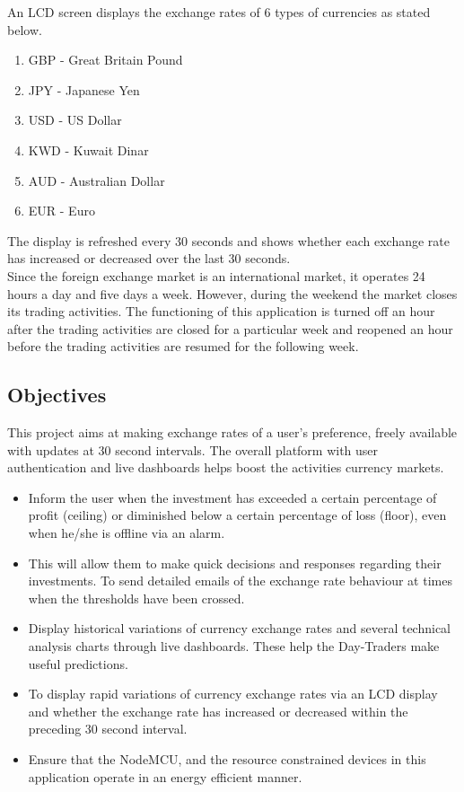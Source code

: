 An LCD screen displays the exchange rates of 6 types of currencies as stated below.

\begin{enumerate}[itemsep=-1.7mm]

\item GBP - Great Britain Pound
\item JPY - Japanese Yen
\item USD - US Dollar
\item KWD - Kuwait Dinar
\item AUD - Australian Dollar
\item EUR - Euro

\end{enumerate}

The display is refreshed every 30 seconds and shows whether each exchange rate has increased or decreased over the last 30 seconds.\\

Since the foreign exchange market is an international market, it operates 24 hours a day and five days a week. However, during the weekend the market closes its trading activities. The functioning of this application is turned off an hour after the trading activities are closed for a particular week and reopened an hour before the trading activities are resumed for the following week.


\subsection{Objectives}

This project aims at making exchange rates of a user’s preference, freely available with updates at 30 second intervals. The overall platform with user authentication and live dashboards helps boost the activities currency markets.

\begin{itemize}[itemsep=-1.7mm]

\item Inform the user when the investment has exceeded a certain percentage of profit (ceiling) or diminished below a certain percentage of loss (floor), even when he/she is offline via an alarm. \item This will allow them to make quick decisions and responses regarding their investments.
To send detailed emails of the exchange rate behaviour at times when the thresholds have been crossed.
\item Display historical variations of currency exchange rates and several technical analysis charts through live dashboards. These help the Day-Traders make useful predictions.
\item To display rapid variations of currency exchange rates via an LCD display and whether the exchange rate has increased or decreased within the preceding 30 second interval.
\item Ensure that the NodeMCU, and the resource constrained devices in this application operate in an energy efficient manner.


\end{itemize}


